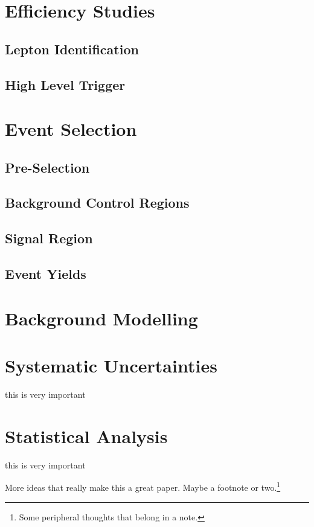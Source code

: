 \section{Efficiency Studies}
\subsection{Lepton Identification}
\subsection{High Level Trigger}

\section{Event Selection}
\subsection{Pre-Selection}
\subsection{Background Control Regions}
\subsection{Signal Region}
\subsection{Event Yields}

\section{Background Modelling}
\section{Systematic Uncertainties}
this is very important

\section{Statistical Analysis}
this is very important

More ideas that really make this a great paper. Maybe a footnote or two.\footnote{Some peripheral thoughts that belong in a note.}


